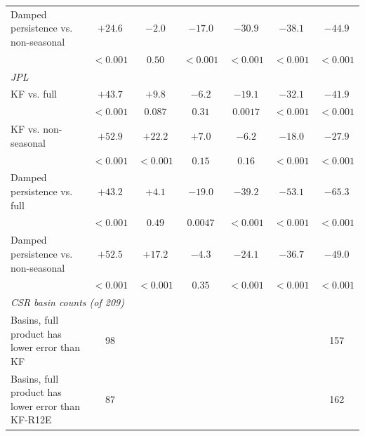 \documentclass[hess, manuscript]{copernicus}
\begin{document}
\begin{table}[!htbp]
\begin{tabular}{lcccccc}
Damped persistence vs. non-seasonal & $+24.6$ & $-2.0$ & $-17.0$ & $-30.9$ & $-38.1$ & $-44.9$ \\
 & $<0.001$ & $0.50$ & $<0.001$ & $<0.001$ & $<0.001$ & $<0.001$ \\[4pt]
\multicolumn{7}{l}{\textit{JPL}} \\
KF vs. full & $+43.7$ & $+9.8$ & $-6.2$ & $-19.1$ & $-32.1$ & $-41.9$ \\
 & $<0.001$ & $0.087$ & $0.31$ & $0.0017$ & $<0.001$ & $<0.001$ \\
KF vs. non-seasonal & $+52.9$ & $+22.2$ & $+7.0$ & $-6.2$ & $-18.0$ & $-27.9$ \\
 & $<0.001$ & $<0.001$ & $0.15$ & $0.16$ & $<0.001$ & $<0.001$ \\
Damped persistence vs. full & $+43.2$ & $+4.1$ & $-19.0$ & $-39.2$ & $-53.1$ & $-65.3$ \\
 & $<0.001$ & $0.49$ & $0.0047$ & $<0.001$ & $<0.001$ & $<0.001$ \\
Damped persistence vs. non-seasonal & $+52.5$ & $+17.2$ & $-4.3$ & $-24.1$ & $-36.7$ & $-49.0$ \\
 & $<0.001$ & $<0.001$ & $0.35$ & $<0.001$ & $<0.001$ & $<0.001$ \\[4pt]
\multicolumn{7}{l}{\textit{CSR basin counts (of 209)}} \\
Basins, full product has lower error than KF & 98 & & & & & 157 \\
Basins, full product has lower error than KF-R12E & 87 & & & & & 162 \\

\end{tabular}
\end{table}
\end{document}
